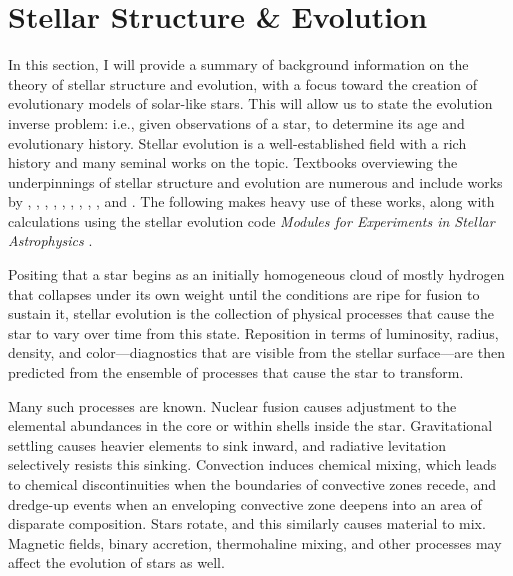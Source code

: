 \section{Stellar Structure \& Evolution} %
\label{sec:evolution}
\begin{shaded}
\noindent In this section, I will provide a summary of background information on the theory of stellar structure and evolution, with a focus toward the creation of evolutionary models of solar-like stars. 
This will allow us to state the evolution inverse problem: i.e., given observations of a star, to determine its age and evolutionary history. 
Stellar evolution is a well-established field with a rich history and many seminal works on the topic.  Textbooks overviewing the underpinnings of stellar structure and evolution are numerous and include works by \cite{1926ics..book.....E}, \cite{1939isss.book.....C}, \cite{1958ses..book.....S}, \cite{1989fsa..book.....C}, \cite{1990sse..book.....K}, \cite{1994sipp.book.....H}, \cite{2005essp.book.....S}, \cite{pols}, \cite{2012sse..book.....K}, and \cite{brown}. 
The following makes heavy use of these works, along with calculations using the stellar evolution code \emph{Modules for Experiments in Stellar Astrophysics} \citep[\textsc{MESA},][%
]{2011apjs..192....3p, 2013apjs..208....4p, 2015apjs..220...15p, 2018ApJS..234...34P}. \end{shaded}

Positing that a star begins as an initially homogeneous cloud of mostly hydrogen that collapses under its own weight until the conditions are ripe for fusion to sustain it, stellar evolution is the collection of physical processes that cause the star to vary over time from this state. 
Reposition in terms of luminosity, radius, density, and color---diagnostics that are visible from the stellar surface---are then predicted from the ensemble of processes that cause the star to transform. 

Many such processes are known. 
Nuclear fusion causes adjustment to the elemental abundances in the core or within shells inside the star. 
Gravitational settling causes heavier elements to sink inward, and radiative levitation selectively resists this sinking. 
Convection induces chemical mixing, which leads to chemical discontinuities when the boundaries of convective zones recede, and dredge-up events when an enveloping convective zone deepens into an area of disparate composition. 
Stars rotate, and this similarly causes material to mix. 
Magnetic fields, binary accretion, thermohaline mixing, and other processes may affect the evolution of stars as well. 


